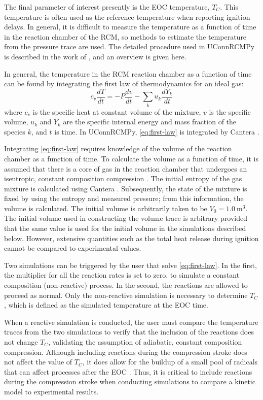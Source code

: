 \documentclass[12pt]{../ussci}
\begin{document}
The final parameter of interest presently is the EOC temperature,
\(T_C\). This temperature is often used as the reference temperature
when reporting ignition delays. In general, it is difficult to measure
the temperature as a function of time in the reaction chamber of the
RCM, so methods to estimate the temperature from the pressure trace are
used. The detailed procedure used in UConnRCMPy is described in the work
of \textcite{Dames2016}, and an overview is given here.

In general, the temperature in the RCM reaction chamber as a function of
time can be found by integrating the first law of thermodynamics for an
ideal gas:
%
\begin{equation} \label{eq:first-law}
    c_v \frac{dT}{dt} = -P \frac{dv}{dt} - \sum_k u_k \frac{d Y_k}{dt}
\end{equation}
%
where \(c_v\) is the specific heat at constant volume of the mixture,
\(v\) is the specific volume, \(u_k\) and \(Y_k\) are the specific
internal energy and mass fraction of the species \(k\), and \(t\) is
time. In UConnRCMPy, \cref{eq:first-law} is integrated by Cantera
\autocite{cantera}.

Integrating \cref{eq:first-law} requires knowledge of the volume of the reaction
chamber as a function of time. To calculate the volume as a function of time, it
is assumed that there is a core of gas in the reaction chamber that undergoes an
isentropic, constant composition compression \autocite{Lee1998}. The initial
entropy of the gas mixture is calculated using Cantera \autocite{cantera}.
Subsequently, the state of the mixture is fixed by using the entropy and
measured pressure; from this information, the volume is calculated. The initial
volume is arbitrarily taken to be \(V_0=\SI{1.0}{\m\cubed}\). The initial volume
used in constructing the volume trace is arbitrary provided that the same value
is used for the initial volume in the simulations described below. However,
extensive quantities such as the total heat release during ignition cannot be
compared to experimental values.

Two simulations can be triggered by the user that solve \cref{eq:first-law}. In
the first, the multiplier for all the reaction rates is set to zero, to simulate
a constant composition (non-reactive) process. In the second, the reactions are
allowed to proceed as normal. Only the non-reactive simulation is necessary to
determine \(T_C\), which is defined as the simulated temperature at the EOC
time.

When a reactive simulation is conducted, the user must compare the
temperature traces from the two simulations to verify that the inclusion
of the reactions does not change \(T_C\), validating the assumption of
adiabatic, constant composition compression. Although including
reactions during the compression stroke does not affect the value of
\(T_C\), it does allow for the buildup of a small pool of radicals that
can affect processes after the EOC \autocite{Mittal2008}. Thus, it is
critical to include reactions during the compression stroke when
conducting simulations to compare a kinetic model to experimental
results.
\end{document}
